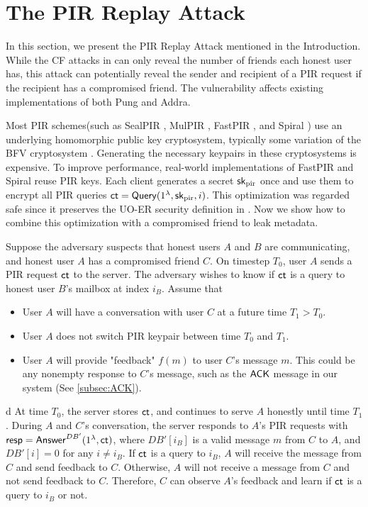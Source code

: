 \section{The PIR Replay Attack}
\label{sec:security-vulnerable}

In this section, we present the PIR Replay Attack mentioned in the Introduction. While the CF attacks in \cite{angel2018cf} can only reveal the number of friends each honest user has, this attack can potentially reveal the sender and recipient of a PIR request if the recipient has a compromised friend. The vulnerability affects existing implementations of both Pung and Addra.

Most PIR schemes(such as SealPIR \cite{angel2018pir}, MulPIR \cite{ali2021communicationcomputation}, FastPIR \cite{ahmad2021addra}, and Spiral \cite{wu2022spiral}) use an underlying homomorphic public key cryptosystem, typically some variation of the BFV cryptosystem \cite{fan2012somewhat}. Generating the necessary keypairs in these cryptosystems is expensive. To improve performance, real-world implementations of FastPIR and Spiral reuse PIR keys. Each client generates a secret ${\mathsf{sk}}_{\text{pir}}$ once and use them to encrypt all PIR queries $\mathsf{ct} = \mathsf{Query}(1^{\lambda}, {\mathsf{sk}}_{\text{pir}}, i)$. This optimization was regarded safe since it preserves the UO-ER security definition in \cite[Extended Version]{angel2016unobservable}. Now we show how to combine this optimization with a compromised friend to leak metadata.

Suppose the adversary suspects that honest users $A$ and $B$ are communicating, and honest user $A$ has a compromised friend $C$. On timestep $T_0$, user $A$ sends a PIR request $\mathsf{ct}$ to the server. The adversary wishes to know if $\mathsf{ct}$ is a query to honest user $B$'s mailbox at index $i_B$. Assume that
\begin{itemize}
    \item User $A$ will have a conversation with user $C$ at a future time $T_1 > T_0$. 
    \item User $A$ does not switch PIR keypair between time $T_0$ and $T_1$.
    \item User $A$ will provide "feedback" $f(m)$ to user $C$'s message $m$. This could be any nonempty response to $C$'s message, such as the $\mathsf{ACK}$ message in our system (See \cref{subsec:ACK}).
\end{itemize}
d
At time $T_0$, the server stores $\mathsf{ct}$, and continues to serve $A$ honestly until time $T_1$. During $A$ and $C$'s conversation, the server responds to $A$'s PIR requests with $\mathsf{resp} = \mathsf{Answer}^{DB'}(1^{\lambda}, \mathsf{ct})$, where $DB'[i_B]$ is a valid message $m$ from $C$ to $A$, and $DB'[i] = 0$ for any $i \neq i_B$. If $\mathsf{ct}$ is a query to $i_B$, $A$ will receive the message from $C$ and send feedback to $C$. Otherwise, $A$ will not receive a message from $C$ and not send feedback to $C$. Therefore, $C$ can observe $A$'s feedback and learn if $\mathsf{ct}$ is a query to $i_B$ or not.


